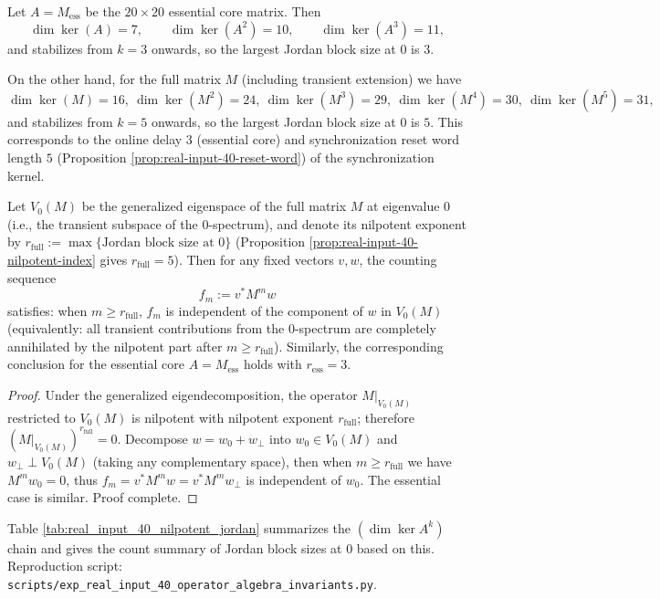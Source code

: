 \begin{proposition}\label{prop:real-input-40-nilpotent-index}
Let $A=M_{\mathrm{ess}}$ be the $20\times 20$ essential core matrix. Then
\[
\dim\ker(A)=7,\qquad
\dim\ker(A^2)=10,\qquad
\dim\ker(A^3)=11,
\]
and stabilizes from $k=3$ onwards, so the largest Jordan block size at $0$ is $3$.

On the other hand, for the full matrix $M$ (including transient extension) we have
\[
\dim\ker(M)=16,\
\dim\ker(M^2)=24,\
\dim\ker(M^3)=29,\
\dim\ker(M^4)=30,\
\dim\ker(M^5)=31,
\]
and stabilizes from $k=5$ onwards, so the largest Jordan block size at $0$ is $5$.
This corresponds to the online delay $3$ (essential core) and synchronization reset word length $5$ (Proposition \ref{prop:real-input-40-reset-word}) of the synchronization kernel.
\end{proposition}
\begin{corollary}\label{cor:real-input-40-nilpotent-memory-depth}
Let \(V_0(M)\) be the generalized eigenspace of the full matrix \(M\) at eigenvalue \(0\) (i.e., the transient subspace of the \(0\)-spectrum), and denote its nilpotent exponent by
\(
r_{\mathrm{full}}:=\max\{\text{Jordan block size at $0$}\}
\)
(Proposition \ref{prop:real-input-40-nilpotent-index} gives \(r_{\mathrm{full}}=5\)).
Then for any fixed vectors \(v,w\), the counting sequence
\[
f_m:=v^\ast M^m w
\]
satisfies: when \(m\ge r_{\mathrm{full}}\), \(f_m\) is independent of the component of \(w\) in \(V_0(M)\) (equivalently: all transient contributions from the \(0\)-spectrum are completely annihilated by the nilpotent part after \(m\ge r_{\mathrm{full}}\)).
Similarly, the corresponding conclusion for the essential core \(A=M_{\mathrm{ess}}\) holds with \(r_{\mathrm{ess}}=3\).
\end{corollary}
\begin{proof}
Under the generalized eigendecomposition, the operator \(M|_{V_0(M)}\) restricted to \(V_0(M)\) is nilpotent with nilpotent exponent \(r_{\mathrm{full}}\);
therefore \((M|_{V_0(M)})^{r_{\mathrm{full}}}=0\).
Decompose \(w=w_0+w_\perp\) into \(w_0\in V_0(M)\) and \(w_\perp\perp V_0(M)\) (taking any complementary space), then when \(m\ge r_{\mathrm{full}}\) we have \(M^m w_0=0\), thus
\(
f_m=v^\ast M^m w=v^\ast M^m w_\perp
\)
is independent of \(w_0\). The essential case is similar. Proof complete.
\end{proof}
\begin{remark}\label{rem:real-input-40-nilpotent-index-repro}
Table \ref{tab:real_input_40_nilpotent_jordan} summarizes the $(\dim\ker A^k)$ chain and gives the count summary of Jordan block sizes at $0$ based on this.
Reproduction script: \texttt{scripts/exp\_real\_input\_40\_operator\_algebra\_invariants.py}.
\end{remark}







